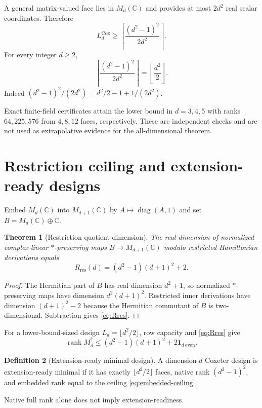 \documentclass[11pt]{article}
\newtheorem{theorem}{Theorem}[section]
\theoremstyle{definition}
\newtheorem{definition}[theorem]{Definition}
\theoremstyle{remark}
\newcommand{\Cox}{\mathrm{Cox}}
\newcommand{\rank}{\operatorname{rank}}
\newcommand{\diag}{\operatorname{diag}}
\begin{document}
A general matrix-valued face lies in $M_d(\mathbb C)$ and provides at most $2d^2$ real scalar coordinates. Therefore
\begin{equation}\label{eq:lower-bound-ceil}
L_d^{\Cox}\ge
\left\lceil\frac{(d^2-1)^2}{2d^2}\right\rceil.
\end{equation}
For every integer $d\ge2$,
\begin{equation}\label{eq:lower-bound}
\left\lceil\frac{(d^2-1)^2}{2d^2}\right\rceil
=\left\lfloor\frac{d^2}{2}\right\rfloor.
\end{equation}
Indeed $(d^2-1)^2/(2d^2)=d^2/2-1+1/(2d^2)$.

Exact finite-field certificates attain the lower bound in $d=3,4,5$ with ranks $64,225,576$ from $4,8,12$ faces, respectively. These are independent checks and are not used as extrapolative evidence for the all-dimensional theorem.

\section{Restriction ceiling and extension-ready designs}
Embed $M_d(\mathbb C)$ into $M_{d+1}(\mathbb C)$ by $A\mapsto\diag(A,1)$ and set $B=M_d(\mathbb C)\oplus\mathbb C$.

\begin{theorem}[Restriction quotient dimension]\label{thm:restriction}
The real dimension of normalized complex-linear $*$-preserving maps $B\to M_{d+1}(\mathbb C)$ modulo restricted Hamiltonian derivations equals
\begin{equation}\label{eq:Rres}
R_{\mathrm{res}}(d)=(d^2-1)(d+1)^2+2.
\end{equation}
\end{theorem}
\begin{proof}
The Hermitian part of $B$ has real dimension $d^2+1$, so normalized $*$-preserving maps have dimension $d^2(d+1)^2$. Restricted inner derivations have dimension $(d+1)^2-2$ because the Hermitian commutant of $B$ is two-dimensional. Subtraction gives \eqref{eq:Rres}.
\end{proof}

For a lower-bound-sized design $L_d=\lfloor d^2/2\rfloor$, row capacity and \eqref{eq:Rres} give
\begin{equation}\label{eq:embedded-ceiling}
\rank M_d^{\uparrow}\le
(d^2-1)(d+1)^2+2\mathbf 1_{d\ \mathrm{even}}.
\end{equation}

\begin{definition}[Extension-ready minimal design]\label{def:er}
A dimension-$d$ Coxeter design is extension-ready minimal if it has exactly $\lfloor d^2/2\rfloor$ faces, native rank $(d^2-1)^2$, and embedded rank equal to the ceiling \eqref{eq:embedded-ceiling}.
\end{definition}
Native full rank alone does not imply extension-readiness.
\end{document}
